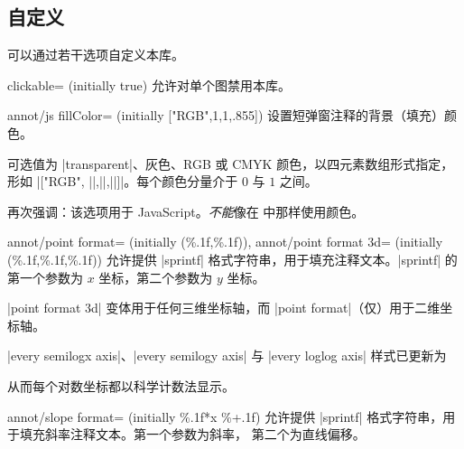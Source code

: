 \subsection{自定义}

可以通过若干选项自定义本库。

\begin{pgfplotskey}{clickable= (initially true)}
    允许对单个图禁用本库。
\end{pgfplotskey}

\begin{pgfplotskey}{annot/js fillColor= (initially ["RGB",1,1,.855])}
    设置短弹窗注释的背景（填充）颜色。

    可选值为 |transparent|、灰色、RGB 或 CMYK 颜色，以四元素数组形式指定，形如
    |["RGB", ||,||,||]|。每个颜色分量介于
    $0$ 与 $1$ 之间。

    再次强调：该选项用于 JavaScript。\emph{不能}像在 \pgfname{} 中那样使用颜色。
\end{pgfplotskey}

\begin{pgfplotskeylist}{%
    annot/point format= (initially {(\%.1f,\%.1f)}),
    annot/point format 3d= (initially {(\%.1f,\%.1f,\%.1f)})%
}
    允许提供 |sprintf| 格式字符串，用于填充注释文本。|sprintf| 的第一个参数为
    $x$ 坐标，第二个参数为 $y$ 坐标。

    |point format 3d| 变体用于任何三维坐标轴，而 |point format|（仅）用于二维坐标轴。

    |every semilogx axis|、|every semilogy axis| 与 |every loglog axis| 样式已更新为
\begin{codeexample}
\end{codeexample}
    \noindent 从而每个对数坐标都以科学计数法显示。
\end{pgfplotskeylist}

\begin{pgfplotskey}{annot/slope format= (initially \%.1f*x \%+.1f)}
    允许提供 |sprintf| 格式字符串，用于填充斜率注释文本。第一个参数为斜率，
    第二个为直线偏移。
\end{pgfplotskey}

